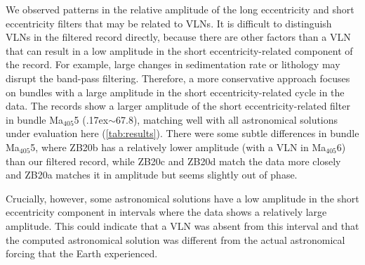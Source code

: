 \documentclass[]{agujournal2019}
\newcommand{\appr}{\raise.17ex\hbox{\(\scriptstyle\sim\)}} %
\newcommand{\ma}[1]{Ma\(_{405}\)#1} %
\newcommand{\rez}{\textcolor{magenta}}
\newcommand{\ijk}{\textcolor{blue}}
\begin{document}
We observed patterns in the relative amplitude of the long eccentricity and short eccentricity filters that may be related to \glspl{VLN}.
It is difficult to distinguish \glspl{VLN} in the filtered record directly, because there are other factors than a \gls{VLN} that can result in a low amplitude in the short eccentricity-related component of the record.
For example, large changes in sedimentation rate or lithology may disrupt the band-pass filtering.
Therefore, a more conservative approach focuses on bundles with a large amplitude in the short eccentricity-related cycle in the data.
The records show a larger amplitude of the short eccentricity-related filter in bundle \ma{5} (\appr\qty{67.8}{\millionyearago}), matching well with all astronomical solutions under evaluation here (\cref{tab:results}).
There were some subtle differences in bundle \ma{5}, where ZB20b has a relatively lower amplitude (with a \gls{VLN} in \ma{6}) than our filtered record, while ZB20c and ZB20d match the data more closely and ZB20a matches it in amplitude but seems slightly out of phase.

Crucially, however, some astronomical solutions have a low amplitude in the short eccentricity component in intervals where the data shows a relatively large amplitude.
This could indicate that a \gls{VLN} was absent from this interval and that the computed astronomical solution was different from the actual astronomical forcing that the Earth experienced.
\end{document}
